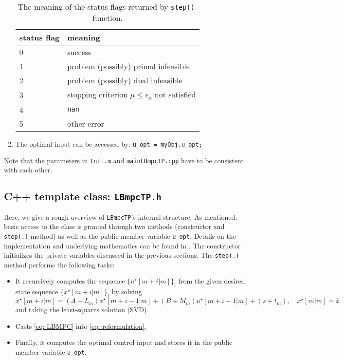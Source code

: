 \documentclass[letter]{article}
\begin{document}
\begin{sffamily}
\begin{enumerate}
	\begin{table}[!htdp]
	\caption{The meaning of the status-flags returned by \texttt{step()}-function.}
	\begin{center}
	\begin{tabular}{|l|l|}\hline
	{
	 \bf status flag} & meaning  \\ \hline\hline
	 0 & success \\
	 1 & problem (possibly) primal infeasible\\
	 2 & problem (possibly) dual infeasible \\
	 3 & stopping criterion $\mu \leq \epsilon_\mu$ not satisfied \\
	 4 & \texttt{nan} \\
	 5 & other error \\ \hline
	\end{tabular}
	\end{center}
	\label{tab: error code}
	\end{table}
	
	\item The optimal input can be accessed by: \texttt{u\_opt = myObj.u\_opt;}
\end{enumerate}


\noindent
Note that the parameters in \texttt{Init.m} and \texttt{mainLBmpcTP.cpp} have to be consistent with each other.



\subsection{C++ template class: \texttt{LBmpcTP.h}}
Here, we give a rough overview of \texttt{LBmpcTP}'s internal structure. As mentioned, basic access to the class is granted through two methods (constructor and \texttt{step(.)}-method) as well as the public member variable \texttt{u\_opt}. Details on the implementation and underlying mathematics can be found in \citep{Zhang2012fastLBMPCPaper, Zhang2011fastLBMPC} \citep{Mehrotra1992PDIPM, Potra2000IPM, Rao98IMP2MPC, Nocedal2000NumOpt}. The constructor initializes the private variables discussed in the previous sections. The \texttt{step(.)}-method performs the following tasks:
\begin{itemize}
	\item It recursively computes the sequence $\{  u^\star[m+i|m]  \}_i$ from the given desired state sequence $\{ x^\star[m+i|m] \}_i$ by solving 
	\begin{equation*}
			x^\star [m+i|m] = (A+L_m)x^\star[m+i-1|m] + (B+M_m)u^\star[m+i-1|m] + (s+t_m),\quad x^\star[m|m]=\hat{x}
	\end{equation*}
	and taking the least-squares solution (SVD).
	\item Casts \eqref{eq: LBMPC} into \eqref{eq: reformulation}.
	\item Finally, it computes the optimal control input and stores it in the public member variable \texttt{u\_opt}.
\end{itemize}



\end{sffamily}
\end{document}
